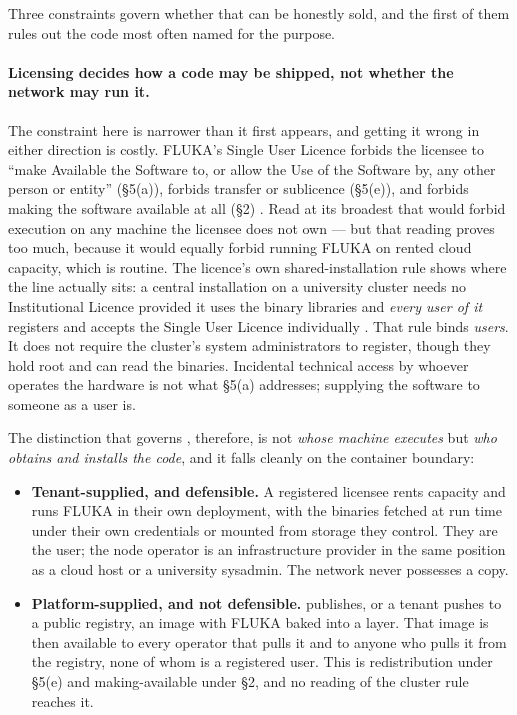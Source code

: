 Three constraints govern whether that can be honestly sold, and the first of them rules out the code
most often named for the purpose.

\paragraph{Licensing decides how a code may be shipped, not whether the network may run it.} The
constraint here is narrower than it first appears, and getting it wrong in either direction is
costly. FLUKA's Single User Licence forbids the licensee to ``make Available the Software to, or
allow the Use of the Software by, any other person or entity'' (\S5(a)), forbids transfer or
sublicence (\S5(e)), and forbids making the software available at all (\S2)
. Read at its
broadest that would forbid execution on any machine the licensee does not own --- but that reading
proves too much, because it would equally forbid running FLUKA on rented cloud capacity, which is
routine. The licence's own shared-installation rule shows where the line actually sits: a central
installation on a university cluster needs no Institutional Licence provided it uses the binary
libraries and \emph{every user of it} registers and accepts the Single User Licence individually
. That rule binds \emph{users}. It
does not require the cluster's system administrators to register, though they hold root and can read
the binaries. Incidental technical access by whoever operates the hardware is not what \S5(a)
addresses; supplying the software to someone as a user is.

The distinction that governs \Flux{}, therefore, is not \emph{whose machine executes} but \emph{who
obtains and installs the code}, and it falls cleanly on the container boundary:

\begin{itemize}
  \item \textbf{Tenant-supplied, and defensible.} A registered licensee rents capacity and runs
        FLUKA in their own deployment, with the binaries fetched at run time under their own
        credentials or mounted from storage they control. They are the user; the node operator is an
        infrastructure provider in the same position as a cloud host or a university sysadmin. The
        network never possesses a copy.
  \item \textbf{Platform-supplied, and not defensible.} \Flux{} publishes, or a tenant pushes to a
        public registry, an image with FLUKA baked into a layer. That image is then available to
        every operator that pulls it and to anyone who pulls it from the registry, none of whom is a
        registered user. This is redistribution under \S5(e) and making-available under \S2, and no
        reading of the cluster rule reaches it.
\end{itemize}

